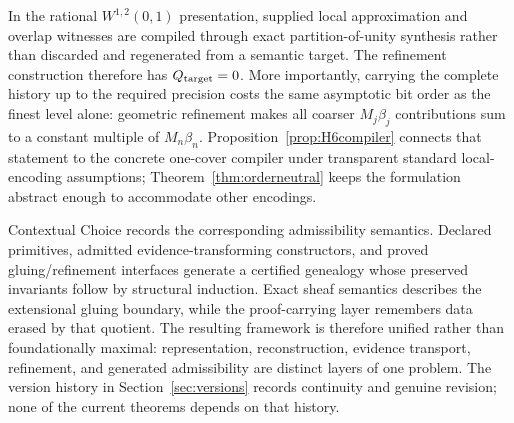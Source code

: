 \documentclass[11pt]{article}
\theoremstyle{definition}
\begin{document}
In the rational $W^{1,2}(0,1)$ presentation, supplied local approximation and overlap
witnesses are compiled through exact partition-of-unity synthesis rather than discarded
and regenerated from a semantic target.  The refinement construction therefore has
$Q_{\rm target}=0$.  More importantly, carrying the complete history up to the required
precision costs the same asymptotic bit order as the finest level alone:
geometric refinement makes all coarser $M_j\beta_j$ contributions sum to a constant
multiple of $M_n\beta_n$.  Proposition~\ref{prop:H6compiler} connects that statement to
the concrete one-cover compiler under transparent standard local-encoding assumptions;
Theorem~\ref{thm:orderneutral} keeps the formulation abstract enough to accommodate other
encodings.

Contextual Choice records the corresponding admissibility semantics.  Declared primitives,
admitted evidence-transforming constructors, and proved gluing/refinement interfaces
generate a certified genealogy whose preserved invariants follow by structural induction.
Exact sheaf semantics describes the extensional gluing boundary, while the proof-carrying
layer remembers data erased by that quotient.  The resulting framework is therefore
unified rather than foundationally maximal: representation, reconstruction, evidence
transport, refinement, and generated admissibility are distinct layers of one problem.
The version history in Section~\ref{sec:versions} records continuity and genuine revision;
none of the current theorems depends on that history.
\end{document}
